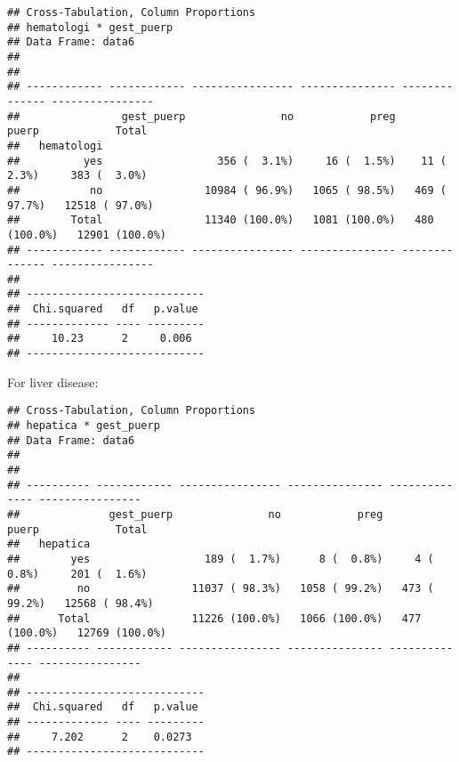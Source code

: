 \documentclass[
]{article}
\newenvironment{Shaded}{\begin{snugshade}}{\end{snugshade}}
\newcommand{\DataTypeTok}[1]{\textcolor[rgb]{0.13,0.29,0.53}{#1}}
\newcommand{\KeywordTok}[1]{\textcolor[rgb]{0.13,0.29,0.53}{\textbf{#1}}}
\newcommand{\NormalTok}[1]{#1}
\newcommand{\OperatorTok}[1]{\textcolor[rgb]{0.81,0.36,0.00}{\textbf{#1}}}
\newcommand{\OtherTok}[1]{\textcolor[rgb]{0.56,0.35,0.01}{#1}}
\newcommand{\StringTok}[1]{\textcolor[rgb]{0.31,0.60,0.02}{#1}}
\begin{document}
\begin{verbatim}
## Cross-Tabulation, Column Proportions  
## hematologi * gest_puerp  
## Data Frame: data6  
## 
## 
## ------------ ------------ ---------------- --------------- -------------- ----------------
##                gest_puerp               no            preg          puerp            Total
##   hematologi                                                                              
##          yes                  356 (  3.1%)     16 (  1.5%)    11 (  2.3%)     383 (  3.0%)
##           no                10984 ( 96.9%)   1065 ( 98.5%)   469 ( 97.7%)   12518 ( 97.0%)
##        Total                11340 (100.0%)   1081 (100.0%)   480 (100.0%)   12901 (100.0%)
## ------------ ------------ ---------------- --------------- -------------- ----------------
## 
## ----------------------------
##  Chi.squared   df   p.value 
## ------------- ---- ---------
##     10.23      2     0.006  
## ----------------------------
\end{verbatim}

For liver disease:

\begin{Shaded}
\end{Shaded}

\begin{verbatim}
## Cross-Tabulation, Column Proportions  
## hepatica * gest_puerp  
## Data Frame: data6  
## 
## 
## ---------- ------------ ---------------- --------------- -------------- ----------------
##              gest_puerp               no            preg          puerp            Total
##   hepatica                                                                              
##        yes                  189 (  1.7%)      8 (  0.8%)     4 (  0.8%)     201 (  1.6%)
##         no                11037 ( 98.3%)   1058 ( 99.2%)   473 ( 99.2%)   12568 ( 98.4%)
##      Total                11226 (100.0%)   1066 (100.0%)   477 (100.0%)   12769 (100.0%)
## ---------- ------------ ---------------- --------------- -------------- ----------------
## 
## ----------------------------
##  Chi.squared   df   p.value 
## ------------- ---- ---------
##     7.202      2    0.0273  
## ----------------------------
\end{verbatim}
\end{document}
